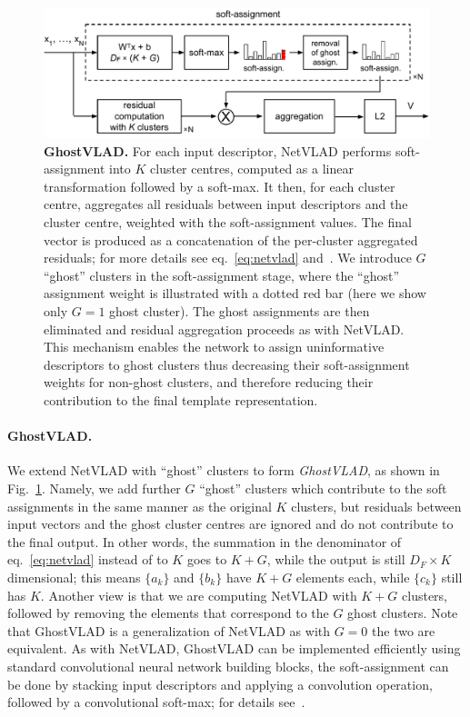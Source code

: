 \documentclass[runningheads]{llncs}
\begin{document}
\begin{figure}[t]
   \begin{center}
         \includegraphics[width=0.99\columnwidth]{images/netvlad.pdf}
   \end{center}
%
   \caption{\textbf{GhostVLAD.}
For each input descriptor, NetVLAD performs soft-assignment
into $K$ cluster centres, computed as a linear transformation
followed by a soft-max.
It then, for each cluster centre, aggregates all residuals 
between input descriptors and the cluster centre,
weighted with the soft-assignment values.
The final vector is produced as a concatenation of the per-cluster
aggregated residuals;
for more details see eq.~\ref{eq:netvlad} and~\cite{Arandjelovic16}.
We introduce $G$ ``ghost'' clusters in the soft-assignment stage,
where the ``ghost'' assignment weight is illustrated
with a dotted red bar (here we show only $G=1$ ghost cluster).
The ghost assignments are then eliminated and residual aggregation
proceeds as with NetVLAD.
This mechanism enables the network to assign uninformative descriptors
to ghost clusters thus decreasing their soft-assignment weights
for non-ghost clusters, and therefore reducing their contribution
to the final template representation.
   }
    \label{fig:ghost}
%
\end{figure}


\paragraph{GhostVLAD.}
We extend NetVLAD with ``ghost'' clusters to form \emph{GhostVLAD},
as shown in Fig.~\ref{fig:ghost}.
Namely, we add further $G$
``ghost'' clusters which contribute to the soft assignments in the
same manner as the original $K$ clusters,
but residuals between input vectors and the ghost cluster centres
are ignored and do not contribute to the final output.
In other words, the summation in the denominator of
eq.~\ref{eq:netvlad} instead of to $K$ goes to $K+G$,
while the output is still $D_F \times K$ dimensional;
this means $\{a_k\}$ and $\{b_k\}$ have $K+G$ elements each,
while $\{c_k\}$ still has $K$.
Another view is that we are computing NetVLAD with $K+G$ clusters,
followed by removing the elements that correspond to the $G$
ghost clusters.
Note that GhostVLAD is a generalization of NetVLAD as with $G=0$
the two are equivalent.
As with NetVLAD, GhostVLAD can be implemented efficiently using
standard convolutional neural network building blocks,
\eg the soft-assignment can be done by stacking input descriptors
and applying a convolution operation, followed by a convolutional soft-max;
for details see~\cite{Arandjelovic16}.
\end{document}
